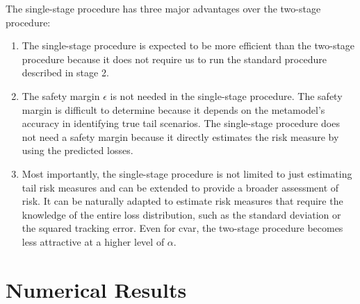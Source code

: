 The single-stage procedure has three major advantages over the two-stage procedure:
\begin{enumerate}
    \item The single-stage procedure is expected to be more efficient than the two-stage procedure because it does not require us to run the standard procedure described in stage 2.
    \item The safety margin $\epsilon$ is not needed in the single-stage procedure.
    The safety margin is difficult to determine because it depends on the metamodel's accuracy in identifying true tail scenarios.
    The single-stage procedure does not need a safety margin because it directly estimates the risk measure by using the predicted losses.
    \item Most importantly, the single-stage procedure is not limited to just estimating tail risk measures and can be extended to provide a broader assessment of risk. 
    It can be naturally adapted to estimate risk measures that require the knowledge of the entire loss distribution, such as the standard deviation or the squared tracking error.
    Even for \gls{cvar}, the two-stage procedure becomes less attractive at a higher level of $\alpha$.
\end{enumerate}

\section{Numerical Results} \label{sec2:numerical}

